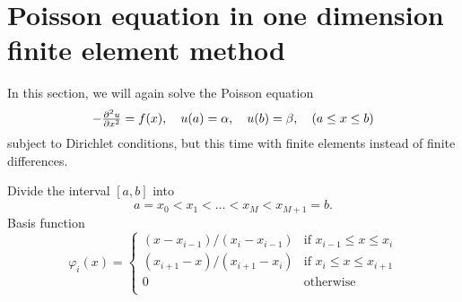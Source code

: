 \section{Poisson equation in one dimension finite element method}

In this section, we will again solve the Poisson equation
\begin{equation}
	-\pd[2]{u}{x} = f(x), \quad u(a) = \alpha, \quad u(b) = \beta, \quad (a \leq x \leq b)
\end{equation}
subject to Dirichlet conditions, but this time with finite elements instead of finite differences.

Divide the interval $[a, b]$ into
\begin{equation*}
	a = x_0 < x_1 < \dots < x_M < x_{M+1} = b.
\end{equation*}
Basis function
\begin{equation*}
	\varphi_i(x) = 
	\begin{cases}
		(x - x_{i-1})/(x_i - x_{i-1}) & \text{if}        \,\, x_{i-1} \leq x \leq x_i     \\
		(x_{i+1} - x)/(x_{i+1} - x_i) & \text{if}        \,\, x_i     \leq x \leq x_{i+1} \\
		0                             & \text{otherwise} \\
	\end{cases}
	\label{basisfunction}
\end{equation*}


\newcommand\basisexpand[2]{$#1(#2) = \sum_{i=0}^{M+1} #1_i \varphi_i(#2)$}
\newcommand\integral[4]{\int_#3^#4 \dif #2 \, #1}

